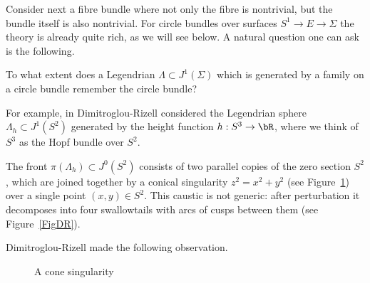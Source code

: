 Consider next a fibre bundle where not only the fibre is nontrivial, but the bundle itself is also nontrivial. For circle bundles over surfaces $S^1 \to E \to \Sigma$ the theory is already quite rich, as we will see below. A natural question one can ask is the following.
\begin{question}\label{Question: remember} To what extent does a Legendrian $\Lambda \subset J^1(\Sigma)$ which is generated by a family on a circle bundle remember the circle bundle?
\end{question}
For example, in \cite{DR11} Dimitroglou-Rizell considered the Legendrian sphere $\Lambda_h \subset J^1(S^2)$ generated by the height function $h:S^3 \to \bR$, where we think of $S^3$ as the Hopf bundle over $S^2$. \begin{remark} The front $\pi(\Lambda_h)\!\subset\!J^0(S^2)$ consists of two parallel copies of the zero section $S^2$, which are joined together by a conical singularity $z^2\!=\!x^2+y^2$ (see Figure~\ref{Fig: cone}) over a single point $(x,y) \in S^2$. This caustic is not generic: after perturbation it decomposes into four swallowtails with arcs of cusps between them (see Figure~\ref{FigDR}).
\end{remark}
Dimitroglou-Rizell made the following observation.

\begin{figure}[htbp]
\begin{center}
\caption{\smaller A cone singularity}
\label{Fig: cone}
\end{center}
\end{figure}

